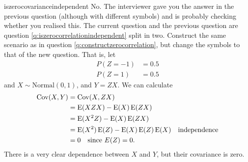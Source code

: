 \begin{answer}{iszerocovarianceindependent}
No. The interviewer gave you the answer in the previous question
(although with different symbols)
and is probably checking whether you realised this.
The current question and the previous question are question \ref{q:iszerocorrelationindependent} split in two.
Construct the same scenario as in question \ref{q:constructzerocorrelation}, but change the symbols to that of the new question.
That is, let
\begin{align*}
P(Z = -1) &= 0.5  \\
P(Z =  1) &= 0.5
\end{align*}
and
$X \sim \text{Normal}(0,1)$, and
$Y = ZX$.
We can calculate
\begin{align*}
\operatorname{\mathrm{Cov}}(X,Y)
&= \operatorname{\mathrm{Cov}}(X, ZX) \\
&= \operatorname{\mathrm{E}}(XZX) - \operatorname{\mathrm{E}}(X) \operatorname{\mathrm{E}}(ZX)  \\
&= \operatorname{\mathrm{E}}(X^2 Z) - \operatorname{\mathrm{E}}(X) \operatorname{\mathrm{E}}(ZX)  \\
&= \operatorname{\mathrm{E}}(X^2) \operatorname{\mathrm{E}}(Z) - \operatorname{\mathrm{E}}(X)\operatorname{\mathrm{E}}(Z)\operatorname{\mathrm{E}}(X)   \quad \text{independence} \\
&=  0                                \quad \text{since } E(Z)=0
\text{.}
\end{align*}
There is a very clear dependence between $X$ and $Y$, but their covariance is zero.
\end{answer}
